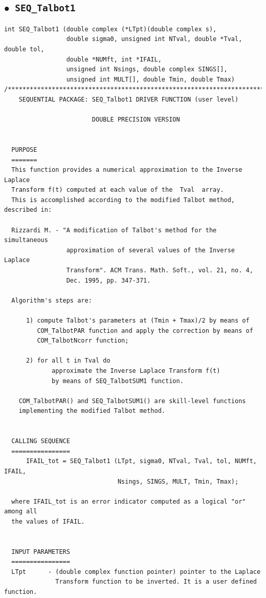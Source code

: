 \documentclass[a4paper,10pt]{report}%
\begin{document}
\subsection{\texorpdfstring{$\boldsymbol{\bullet}$}{ - }{\tt\ SEQ\_Talbot1}}
\begin{lstlisting}
int SEQ_Talbot1 (double complex (*LTpt)(double complex s),
                 double sigma0, unsigned int NTval, double *Tval, double tol,
                 double *NUMft, int *IFAIL,
                 unsigned int Nsings, double complex SINGS[],
                 unsigned int MULT[], double Tmin, double Tmax)
/*****************************************************************************
    SEQUENTIAL PACKAGE: SEQ_Talbot1 DRIVER FUNCTION (user level)

                        DOUBLE PRECISION VERSION


  PURPOSE
  =======
  This function provides a numerical approximation to the Inverse Laplace
  Transform f(t) computed at each value of the  Tval  array.
  This is accomplished according to the modified Talbot method, described in:

  Rizzardi M. - "A modification of Talbot's method for the simultaneous
                 approximation of several values of the Inverse Laplace
                 Transform". ACM Trans. Math. Soft., vol. 21, no. 4,
                 Dec. 1995, pp. 347-371.

  Algorithm's steps are:

      1) compute Talbot's parameters at (Tmin + Tmax)/2 by means of
         COM_TalbotPAR function and apply the correction by means of
         COM_TalbotNcorr function;

      2) for all t in Tval do
             approximate the Inverse Laplace Transform f(t)
             by means of SEQ_TalbotSUM1 function.

	COM_TalbotPAR() and SEQ_TalbotSUM1() are skill-level functions
	implementing the modified Talbot method.


  CALLING SEQUENCE
  ================
      IFAIL_tot = SEQ_Talbot1 (LTpt, sigma0, NTval, Tval, tol, NUMft, IFAIL,
                               Nsings, SINGS, MULT, Tmin, Tmax);

  where IFAIL_tot is an error indicator computed as a logical "or" among all
  the values of IFAIL.


  INPUT PARAMETERS
  ================
  LTpt      - (double complex function pointer) pointer to the Laplace
              Transform function to be inverted. It is a user defined function.


\end{lstlisting}
\end{document}

